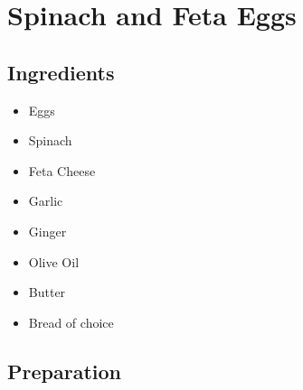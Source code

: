 \thispagestyle{fancy}
\section{Spinach and Feta Eggs}
\AddToShipoutPicture*{\FetaSpinachEggs}

\subsection*{Ingredients}
\begin{multicols}{3}
	\begin{itemize}
		\item Eggs
		\item Spinach
		\item Feta Cheese
		\item Garlic
		\item Ginger
		\item Olive Oil
		\item Butter
		\item Bread of choice
	\end{itemize}
\end{multicols}

\subsection*{Preparation}

